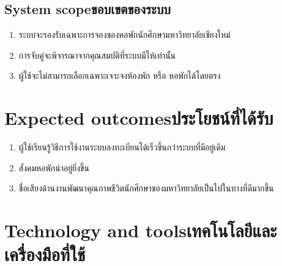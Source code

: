 \subsection{\ifenglish System scope\else ขอบเขตของระบบ\fi}
\begin{enumerate}
    \item ระบบจะรองรับเฉพาะการจองของหอพักนักศึกษามหาวิทยาลัยเชียงใหม่
    \item การจับคู่จะพิจารณาจากคุณสมบัติที่ระบบมีให้เท่านั้น
    \item ผู้ใช้จะไม่สามารถเลือกเฉพาะเจาะจงห้องพัก หรือ หอพักได้โดยตรง
\end{enumerate}

\section{\ifenglish Expected outcomes\else ประโยชน์ที่ได้รับ\fi}
\begin{enumerate}
    \item ผู้ใช้เรียนรู้วิธีการใช้งานระบบลงทะเบียนได้เร็วขึ้นกว่าระบบที่มีอยู่เดิม
    \item สังคมหอพักน่าอยู่ยิ่งขึ้น
    \item ชื่อเสียงด้านงานพัฒนาคุณภาพชีวิตนักศึกษาของมหาวิทยาลัยเป็นไปในทางที่ดีมากขึ้น
\end{enumerate}

\section{\ifenglish Technology and tools\else เทคโนโลยีและเครื่องมือที่ใช้\fi}


